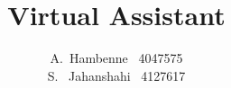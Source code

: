 \documentclass{tudelft-report}
\begin{document}
\frontmatter

\title[Bachelor Thesis - 2015]{Virtual Assistant}
\author{A.\ Hambenne \ 4047575 \\
S. \ Jahanshahi \ 4127617}
\makecover





\tableofcontents

\mainmatter
	

	
% 	
% 	
% 
% 
% 	
% 	







	


	




\appendix

%


\end{document}
